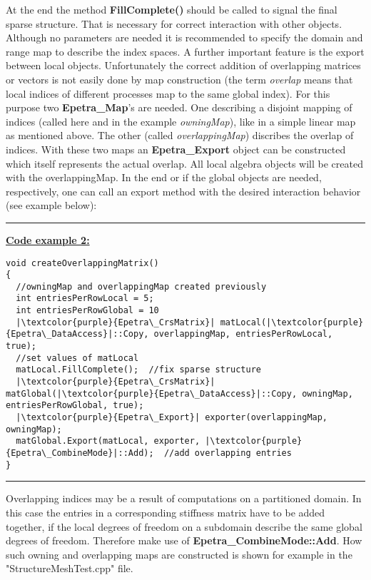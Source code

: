 \documentclass[10pt,a4paper,final,titlepage]{article}
\begin{document}
At the end the method \textbf{FillComplete()} should be called to signal the final sparse structure. That is necessary for correct interaction with other objects. Although no parameters are needed it is recommended to specify the domain and range map to describe the index spaces.
\newline \newline
A further important feature is the export between local objects. Unfortunately the correct addition of overlapping matrices or vectors is not easily done by map construction (the term \textit{overlap} means that local indices of different processes map to the same global index). For this purpose two \textbf{Epetra\_Map}'s are needed. One describing a disjoint mapping of indices (called here and in the example \textit{owningMap}), like in a simple linear map as mentioned above. The other (called \textit{overlappingMap}) discribes the overlap of indices. With these two maps an \textbf{Epetra\_Export} object can be constructed which itself represents the actual overlap. All local algebra objects will be created with the overlappingMap. In the end or if the global objects are needed, respectively, one can call an export method with the desired interaction behavior (see example below):

\noindent\rule{\textwidth}{0.5pt}
\textbf{\underline{Code example 2:}}
\begin{verbatim}
void createOverlappingMatrix()
{
  //owningMap and overlappingMap created previously
  int entriesPerRowLocal = 5;
  int entriesPerRowGlobal = 10
  |\textcolor{purple}{Epetra\_CrsMatrix}| matLocal(|\textcolor{purple}{Epetra\_DataAccess}|::Copy, overlappingMap, entriesPerRowLocal, true);
  //set values of matLocal
  matLocal.FillComplete();  //fix sparse structure
  |\textcolor{purple}{Epetra\_CrsMatrix}| matGlobal(|\textcolor{purple}{Epetra\_DataAccess}|::Copy, owningMap, entriesPerRowGlobal, true);
  |\textcolor{purple}{Epetra\_Export}| exporter(overlappingMap, owningMap);
  matGlobal.Export(matLocal, exporter, |\textcolor{purple}{Epetra\_CombineMode}|::Add);  //add overlapping entries
}
\end{verbatim}
\noindent\rule{\textwidth}{0.5pt}
\newline \newline
Overlapping indices may be a result of computations on a partitioned domain. In this case the entries in a corresponding stiffness matrix have to be added together, if the local degrees of freedom on a subdomain describe the same global degrees of freedom. Therefore make use of \textbf{Epetra\_CombineMode::Add}. How such owning and overlapping maps are constructed is shown for example in the "StructureMeshTest.cpp" file.
\end{document}
